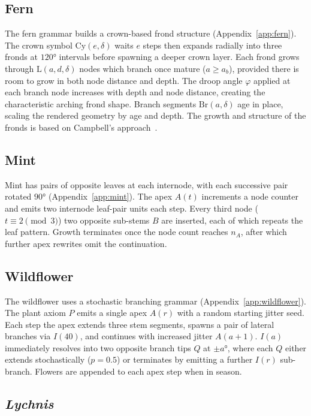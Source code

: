 \subsection{Fern}

The fern grammar builds a crown-based frond structure (Appendix~\ref{app:fern}). The crown symbol
$\mathrm{Cy}(e, \delta)$ waits $e$
steps then expands radially into three fronds at $120°$ intervals before spawning a deeper crown layer. Each
frond grows through $\mathrm{L}(a, d, \delta)$ nodes which branch once mature ($a \ge a_b$), provided there
is room to grow in both node distance and depth. The droop angle $\varphi$ applied at each branch node
increases with depth and node distance, creating the characteristic arching frond shape. Branch segments
$\mathrm{Br}(a, \delta)$ age in place, scaling the rendered geometry by age and depth. The growth and
structure of the fronds is based on Campbell's approach~\cite{campbellDescribingShapesFern1996}.

\subsection{Mint}

Mint has pairs of opposite leaves at each internode, with each successive pair rotated $90°$
(Appendix~\ref{app:mint}). The apex $A(t)$ increments a node counter and emits two internode leaf-pair units
each step. Every third node ($t \equiv 2 \pmod{3}$) two opposite sub-stems $B$ are inserted, each of which
repeats the leaf pattern. Growth terminates once the node count reaches $n_A$, after which further apex
rewrites omit the continuation.

\subsection{Wildflower}

The wildflower uses a stochastic branching grammar (Appendix~\ref{app:wildflower}). The plant axiom $P$ emits
a single apex $A(r)$ with a random starting jitter seed. Each step the apex extends three stem segments, spawns
a pair of lateral branches via $I(40)$, and continues with increased jitter $A(a{+}1)$. $I(a)$ immediately
resolves into two opposite branch tips $Q$ at ${\pm}a°$, where each $Q$ either extends stochastically ($p=0.5$)
or terminates by emitting a further $I(r)$ sub-branch. Flowers are appended to each apex step when in season.

\subsection{\textit{Lychnis}}

